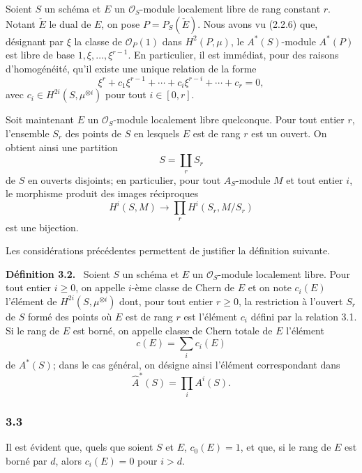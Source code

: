 \documentclass[11pt]{article}
\newenvironment{statement}[1]{\par\medskip\noindent\textbf{#1.}\ }{\par\medskip}
\begin{document}
Soient $S$ un schéma et $E$ un $\mathcal O_S$-module localement libre de rang constant $r$. Notant $\check E$ le dual de $E$, on pose $P=P_S(\check E)$. Nous avons vu (2.2.6) que, désignant par $\xi$ la classe de $\mathcal O_P(1)$ dans $H^2(P,\mu)$, le $A^*(S)$-module $A^*(P)$ est libre de base $1,\xi,\ldots,\xi^{r-1}$. En particulier, il est immédiat, pour des raisons d'homogénéité, qu'il existe une unique relation de la forme
\[
\xi^r+c_1\xi^{r-1}+\cdots+c_i\xi^{r-i}+\cdots+c_r=0,
\tag{3.1}
\]
avec $c_i\in H^{2i}(S,\mu^{\otimes i})$ pour tout $i\in[0,r]$.

Soit maintenant $E$ un $\mathcal O_S$-module localement libre quelconque. Pour tout entier $r$, l'ensemble $S_r$ des points de $S$ en lesquels $E$ est de rang $r$ est un ouvert. On obtient ainsi une partition
\[
S=\coprod_r S_r
\]
de $S$ en ouverts disjoints; en particulier, pour tout $A_S$-module $M$ et tout entier $i$, le morphisme produit des images réciproques
\[
H^i(S,M)\longrightarrow \prod_r H^i(S_r,M/S_r)
\]
est une bijection.

Les considérations précédentes permettent de justifier la définition suivante.

\begin{statement}{Définition 3.2}
Soient $S$ un schéma et $E$ un $\mathcal O_S$-module localement libre. Pour tout entier $i\ge0$, on appelle $i$-ème classe de Chern de $E$ et on note $c_i(E)$ l'élément de $H^{2i}(S,\mu^{\otimes i})$ dont, pour tout entier $r\ge0$, la restriction à l'ouvert $S_r$ de $S$ formé des points où $E$ est de rang $r$ est l'élément $c_i$ défini par la relation 3.1. Si le rang de $E$ est borné, on appelle classe de Chern totale de $E$ l'élément
\[
c(E)=\sum_i c_i(E)
\]
de $A^*(S)$; dans le cas général, on désigne ainsi l'élément correspondant dans
\[
\widehat A^*(S)=\prod_i A^i(S).
\]
\end{statement}

\subsubsection*{3.3}
Il est évident que, quels que soient $S$ et $E$, $c_0(E)=1$, et que, si le rang de $E$ est borné par $d$, alors $c_i(E)=0$ pour $i>d$.
\end{document}
